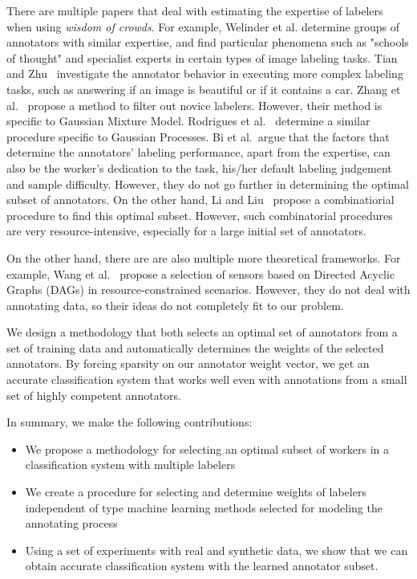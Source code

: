 \documentclass{llncs}
\begin{document}
There are multiple papers that deal with estimating the expertise of labelers when using \textit{wisdom of crowds}. For example, Welinder et al. \cite{welinder2010multidimensional} determine groups of annotators with similar expertise, and find particular phenomena such as "schools of thought" and specialist experts in certain types of image labeling tasks. Tian and Zhu~\cite{tian2012learning} investigate the annotator behavior in executing more complex labeling tasks, such as answering if an image is beautiful or if it contains a car. Zhang et al.~\cite{zhang2013learning} propose a method to filter out novice labelers. However, their method is specific to Gaussian Mixture Model. Rodrigues et al.~\cite{rodrigues2014gaussian} determine a similar procedure specific to Gaussian Processes. Bi et al.~\cite{bi2014learning}argue that the factors that determine the annotators' labeling performance, apart from the expertise, can also be the worker's dedication to the task, his/her default labeling judgement and sample difficulty. However, they do not go further in determining the optimal subset of annotators. On the other hand, Li and Liu~\cite{li_liu_2015} propose a combinatiorial procedure to find this optimal subset. However, such combinatorial procedures are very resource-intensive, especially for a large initial set of annotators.

On the other hand, there are are also multiple more theoretical frameworks. For example, Wang et al.~\cite{wang2015efficient} propose a selection of sensors based on Directed Acyclic Graphs (DAGs) in resource-constrained scenarios. However, they do not deal with annotating data, so their ideas do not completely fit to our problem. 

We design a methodology that both selects an optimal set of annotators from a set of training data and automatically determines the weights of the selected annotators. By forcing sparsity on our annotator weight vector, we get an accurate classification system that works well even with annotations from a small set of highly competent annotators.

In summary, we make the following contributions:
\begin{itemize}
\item We propose a methodology for selecting an optimal subset of workers in a classification system with multiple labelers
\item We create a procedure for selecting and determine weights of labelers independent of type machine learning methods selected for modeling the annotating process
\item Using a set of experiments with real and synthetic data, we show that we can obtain accurate classification system with the learned annotator subset.
\end{itemize}  
\end{document}
